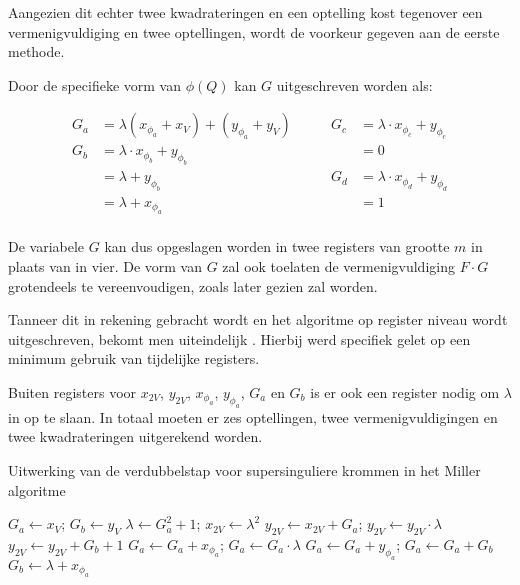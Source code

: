 Aangezien dit echter twee kwadrateringen en een optelling kost tegenover een vermenigvuldiging en twee optellingen, wordt de voorkeur gegeven aan de eerste methode.

Door de specifieke vorm van $\phi(Q)$ kan $G$ uitgeschreven worden als:

\[\begin{aligned}
	G_a	&=	\lambda (x_{\phi_a} + x_V) + (y_{\phi_a} + y_V)\qquad&
				G_c	&= \lambda \cdot x_{\phi_c} + y_{\phi_c}\\
	G_b	&=	\lambda \cdot x_{\phi_b} + y_{\phi_b}&
						&= 0\\
			&= \lambda + y_{\phi_b}&
				G_d	&= \lambda \cdot x_{\phi_d} + y_{\phi_d}\\
			&=	\lambda + x_{\phi_a}&
						&= 1\\
\end{aligned}\]

De variabele $G$ kan dus opgeslagen worden in twee registers van grootte $m$ in plaats van in vier. De vorm van $G$ zal ook toelaten de vermenigvuldiging $F \cdot G$ grotendeels te vereenvoudigen, zoals later gezien zal worden.

Tanneer dit in rekening gebracht wordt en het algoritme op register niveau wordt uitgeschreven, bekomt men uiteindelijk . Hierbij werd specifiek gelet op een minimum gebruik van tijdelijke registers.

Buiten registers voor $x_{2V}$, $y_{2V}$, $x_{\phi_a}$, $y_{\phi_a}$, $G_a$ en $G_b$ is er ook een register nodig om $\lambda$ in op te slaan. In totaal moeten er zes optellingen, twee vermenigvuldigingen en twee kwadrateringen uitgerekend worden.

\begin{algorithm}[h]
	\caption{Uitwerking van de verdubbelstap voor supersinguliere krommen in het Miller algoritme}
	\label{algoritme-implementatie-miller-double-detail}
	$G_a \leftarrow x_V$; $G_b \leftarrow y_V$\;
	$\lambda \leftarrow G_a^2 + 1$; $x_{2V} \leftarrow \lambda ^2$\;
	$y_{2V} \leftarrow x_{2V} + G_a$; $y_{2V} \leftarrow y_{2V} \cdot \lambda$\;
	$y_{2V} \leftarrow y_{2V} + G_b + 1$\;
	$G_a \leftarrow G_a + x_{\phi_a}$; $G_a \leftarrow G_a \cdot \lambda$\;
	$G_a \leftarrow G_a + y_{\phi_a}$; $G_a \leftarrow G_a + G_b$\;
	$G_b \leftarrow \lambda + x_{\phi_a}$\;
\end{algorithm}

